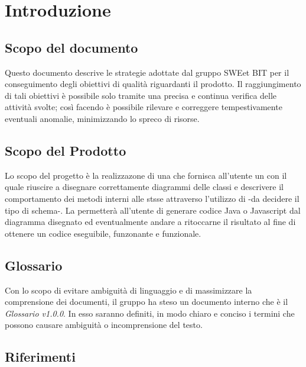\section{Introduzione}
  \subsection{Scopo del documento}
          Questo documento descrive le strategie adottate dal gruppo SWEet BIT per il conseguimento degli obiettivi di qualità riguardanti il prodotto.
          Il raggiungimento di tali obiettivi è possibile solo tramite una precisa e continua verifica delle attività svolte; così facendo è possibile
          rilevare e correggere tempestivamente eventuali anomalie, minimizzando lo spreco di risorse.
  \subsection{Scopo del Prodotto}
          Lo scopo del progetto è la realizzazone di una  che fornisca all'utente un   con il quale riuscire a disegnare correttamente diagrammi delle classi
          e descrivere il comportamento dei metodi interni alle stsse attraverso l'utilizzo di -da decidere il tipo di schema-.
          La  permetterà all'utente di generare codice Java o Javascript dal diagramma disegnato ed eventualmente andare a ritoccarne il risultato al fine di ottenere un codice
          eseguibile, funzonante e funzionale.
  \subsection{Glossario}
          Con lo scopo di evitare ambiguità di linguaggio e di massimizzare la comprensione dei documenti, il
          gruppo ha steso un documento interno che è il \emph{Glossario v1.0.0}. In esso saranno definiti, in modo
          chiaro e conciso i termini che possono causare ambiguità o incomprensione del testo.
  \subsection{Riferimenti}
